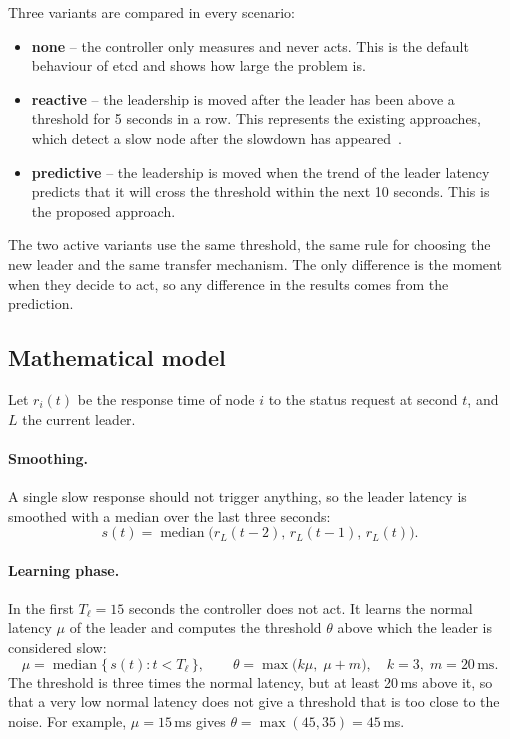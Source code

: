 \documentclass[11pt,a4paper]{article}
\begin{document}
Three variants are compared in every scenario:
\begin{itemize}
  \item \textbf{none} -- the controller only measures and never acts. This is the default behaviour of etcd and shows how large the problem is.
  \item \textbf{reactive} -- the leadership is moved after the leader has been above a threshold for 5 seconds in a row. This represents the existing approaches, which detect a slow node after the slowdown has appeared~\cite{iaso,perseus}.
  \item \textbf{predictive} -- the leadership is moved when the trend of the leader latency predicts that it will cross the threshold within the next 10 seconds. This is the proposed approach.
\end{itemize}
The two active variants use the same threshold, the same rule for choosing the new leader and the same transfer mechanism. The only difference is the moment when they decide to act, so any difference in the results comes from the prediction.

\subsection{Mathematical model}

Let $r_i(t)$ be the response time of node $i$ to the status request at second $t$, and $L$ the current leader.

\paragraph{Smoothing.} A single slow response should not trigger anything, so the leader latency is smoothed with a median over the last three seconds:
\begin{equation}
  s(t) = \operatorname{median}\big(r_L(t-2),\, r_L(t-1),\, r_L(t)\big).
\end{equation}

\paragraph{Learning phase.} In the first $T_\ell = 15$ seconds the controller does not act. It learns the normal latency $\mu$ of the leader and computes the threshold $\theta$ above which the leader is considered slow:
\begin{equation}
  \mu = \operatorname{median}\{\, s(t) : t < T_\ell \,\}, \qquad
  \theta = \max\big(k\mu,\; \mu + m\big), \quad k = 3,\; m = 20\,\text{ms}.
\end{equation}
The threshold is three times the normal latency, but at least 20\,ms above it, so that a very low normal latency does not give a threshold that is too close to the noise. For example, $\mu = 15$\,ms gives $\theta = \max(45, 35) = 45$\,ms.
\end{document}
